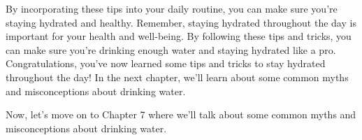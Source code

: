 By incorporating these tips into your daily routine, you can make sure you're staying hydrated and healthy.
Remember, staying hydrated throughout the day is important for your health and well-being. By following these tips and tricks, you can make sure you're drinking enough water and staying hydrated like a pro.
Congratulations, you've now learned some tips and tricks to stay hydrated throughout the day! In the next chapter, we'll learn about some common myths and misconceptions about drinking water.


Now, let's move on to Chapter 7 where we'll talk about some common myths and misconceptions about drinking water.
